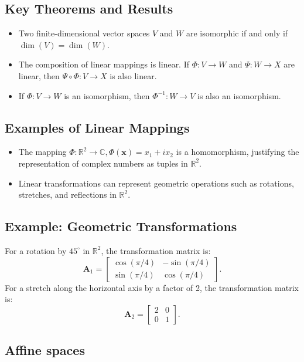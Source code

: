 \subsection{Key Theorems and Results}
\begin{itemize}
    \item Two finite-dimensional vector spaces \(V\) and \(W\) are isomorphic if and only if \(\dim(V) = \dim(W)\).

    \item The composition of linear mappings is linear. If \(\Phi: V \to W\) and \(\Psi: W \to X\) are linear, then \(\Psi \circ \Phi: V \to X\) is also linear.

    \item If \(\Phi: V \to W\) is an isomorphism, then \(\Phi^{-1}: W \to V\) is also an isomorphism.
\end{itemize}

\subsection{Examples of Linear Mappings}
\begin{itemize}
    \item The mapping \(\Phi: \mathbb{R}^2 \to \mathbb{C}, \Phi(\mathbf{x}) = x_1 + i x_2\) is a homomorphism, justifying the representation of complex numbers as tuples in \(\mathbb{R}^2\).

    \item Linear transformations can represent geometric operations such as rotations, stretches, and reflections in \(\mathbb{R}^2\).
\end{itemize}

\subsection{Example: Geometric Transformations}
For a rotation by \(45^\circ\) in \(\mathbb{R}^2\), the transformation matrix is:
\[
\mathbf{A}_1 = \begin{bmatrix} \cos(\pi/4) & -\sin(\pi/4) \\ \sin(\pi/4) & \cos(\pi/4) \end{bmatrix}.
\]
For a stretch along the horizontal axis by a factor of 2, the transformation matrix is:
\[
\mathbf{A}_2 = \begin{bmatrix} 2 & 0 \\ 0 & 1 \end{bmatrix}.
\]


\subsection{Affine spaces}
